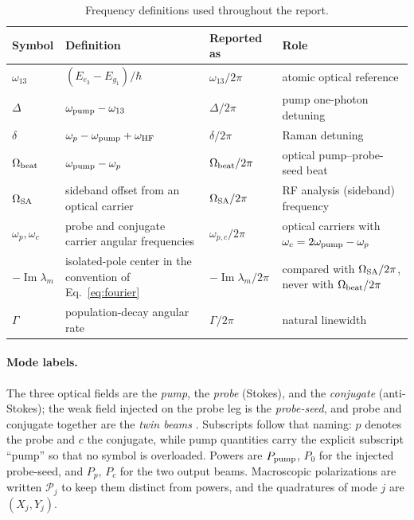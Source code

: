 \documentclass[11pt,a4paper]{article}
\newcommand{\Ima}{\operatorname{Im}}
\begin{document}
\begin{table}[ht]
\centering
\caption{Frequency definitions used throughout the report.}
\label{tab:frequency-definitions}
\small
\begin{tabularx}{\textwidth}{L{2.5cm}L{4.2cm}L{3.3cm}Y}
\toprule
Symbol & Definition & Reported as & Role\\
\midrule
$\omega_{13}$ & $(E_{e_3}-E_{g_1})/\hbar$ &
$\omega_{13}/2\pi$ & atomic optical reference\\
$\Delta$ & $\omega_{\rm pump}-\omega_{13}$ &
$\Delta/2\pi$ & pump one-photon detuning\\
$\delta$ & $\omega_p-\omega_{\rm pump}+\omega_{\rm HF}$ &
$\delta/2\pi$ & Raman detuning\\
$\Omega_{\rm beat}$ & $\omega_{\rm pump}-\omega_p$ &
$\Omega_{\rm beat}/2\pi$ & optical pump--probe-seed beat\\
$\Omega_{\rm SA}$ & sideband offset from an optical carrier &
$\Omega_{\rm SA}/2\pi$ & RF analysis (sideband) frequency\\
$\omega_p,\omega_c$ & probe and conjugate carrier angular frequencies &
$\omega_{p,c}/2\pi$ & optical carriers with
$\omega_c=2\omega_{\rm pump}-\omega_p$\\
$-\Ima\lambda_m$ & isolated-pole center in the convention of
Eq.~\eqref{eq:fourier} & $-\Ima\lambda_m/2\pi$ & compared with
$\Omega_{\rm SA}/2\pi$, never with $\Omega_{\rm beat}/2\pi$\\
$\Gamma$ & population-decay angular rate &
$\Gamma/2\pi$ & natural linewidth\\
\bottomrule
\end{tabularx}
\end{table}

\paragraph{Mode labels.}
The three optical fields are the \emph{pump}, the \emph{probe} (Stokes), and
the \emph{conjugate} (anti-Stokes); the weak field injected on the probe leg
is the \emph{probe-seed}, and probe and conjugate together are the
\emph{twin beams} \cite{Sim2025}. Subscripts follow that naming:
$p$ denotes the probe and $c$ the conjugate, while pump quantities carry the
explicit subscript ``pump'' so that no symbol is overloaded. Powers are
$P_{\rm pump}$, $P_0$ for the injected probe-seed, and $P_p$, $P_c$ for the
two output beams. Macroscopic polarizations are written $\mathcal P_j$ to
keep them distinct from powers, and the quadratures of mode $j$ are
$(X_j,Y_j)$.
\end{document}
